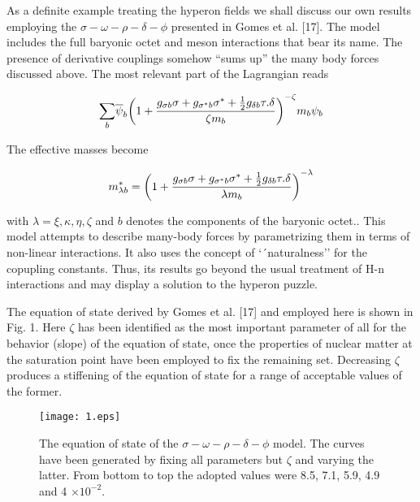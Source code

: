 \documentclass[a4paper]{jpconf}
\begin{document}
As a definite example treating the hyperon fields we shall discuss our own results employing the $\sigma - \omega - \rho - \delta - \phi$ 
presented in Gomes et al. [17]. The model includes the full baryonic octet and meson interactions that bear its name. 
The presence of derivative couplings somehow ``sums up'' the many body forces discussed above.  The most relevant part of the 
Lagrangian reads

\begin{equation}
{\sum_{b}}{\overline \psi_{b}}{\biggl( 1 + {{g_{\sigma b} \sigma + g_{\sigma^{*} b} {\sigma^{*}} + {1\over{2}} g_{\delta b} {\bf {\tau}. {\delta}}} \over{\zeta m_{b}}} \biggr)}^{-\zeta} m_{b} \psi_{b} 
\end{equation}

The effective masses become

\begin{equation}
m_{\lambda b}^{*} = {\biggl( 1 + {{g_{\sigma b} \sigma + g_{\sigma^{*} b} {\sigma^{*}} + {1\over{2}} g_{\delta b} {\bf {\tau}. {\delta}}} \over{\lambda m_{b}}} \biggr)}^{-\lambda}
\end{equation}

with $\lambda = \xi, \kappa, \eta, \zeta$ and $b$ denotes the components of the baryonic octet.. This model attempts to describe many-body forces by parametrizing them in terms of 
non-linear interactions. It also uses the concept of `´naturalness'' for the copupling constants. 
Thus, its results go beyond the usual treatment of H-n interactions and may display a solution to the hyperon puzzle.

The equation of state derived by Gomes et al. [17] and employed here is shown in Fig. 1. Here $\zeta$ has been identified as the most important parameter of all 
for the behavior (slope) of the equation of state, once the properties of nuclear matter at the saturation point have been employed to fix the remaining set. 
Decreasing $\zeta$ produces a stiffening of the equation of state for a range of acceptable values of the former.

\begin{figure}[h]
\texttt{[image: 1.eps]}\hspace{2pc}%
\begin{minipage}[b]{14pc}\caption{\label{label}The equation of state of the $\sigma - \omega - \rho - \delta - \phi$ model. The curves have been generated by fixing all parameters 
but $\zeta$ and varying the latter. From bottom to top the adopted values were 8.5, 7.1, 5.9, 4.9 and 4 $\times 10^{-2}$.}
\end{minipage}
\end{figure}
\end{document}
